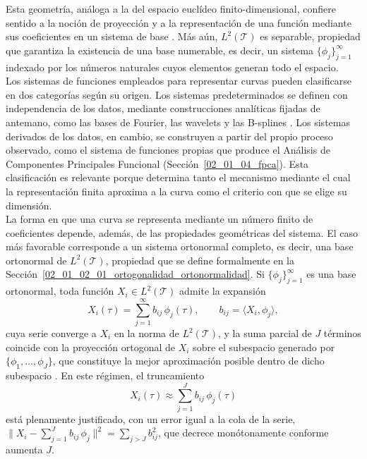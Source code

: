 Esta geometría, análoga a la del espacio euclídeo finito-dimensional, confiere sentido a la noción de proyección y a la representación de una función mediante sus coeficientes en un sistema de base \citep{02_01_kokoszka2017introduction}. Más aún, $L^2(\mathcal{T})$ es separable, propiedad que garantiza la existencia de una base numerable, es decir, un sistema $\{\phi_j\}_{j=1}^{\infty}$ indexado por los números naturales cuyos elementos generan todo el espacio.\\

Los sistemas de funciones empleados para representar curvas pueden clasificarse en dos categorías según su origen. Los sistemas predeterminados se definen con independencia de los datos, mediante construcciones analíticas fijadas de antemano, como las bases de Fourier, las wavelets y las B-splines \citep{02_01_ramsay2006functional}. Los sistemas derivados de los datos, en cambio, se construyen a partir del propio proceso observado, como el sistema de funciones propias que produce el Análisis de Componentes Principales Funcional (Sección~\ref{02_01_04_fpca}). Esta clasificación es relevante porque determina tanto el mecanismo mediante el cual la representación finita aproxima a la curva como el criterio con que se elige su dimensión.\\

La forma en que una curva se representa mediante un número finito de coeficientes depende, además, de las propiedades geométricas del sistema. El caso más favorable corresponde a un sistema ortonormal completo, es decir, una base ortonormal de $L^2(\mathcal{T})$, propiedad que se define formalmente en la Sección~\ref{02_01_02_01_ortogonalidad_ortonormalidad}. Si $\{\phi_j\}_{j=1}^{\infty}$ es una base ortonormal, toda función $X_i \in L^2(\mathcal{T})$ admite la expansión
\begin{equation}
    X_i(\tau) = \sum_{j=1}^{\infty} b_{ij}\, \phi_j(\tau),
    \qquad b_{ij} = \langle X_i, \phi_j \rangle,
\end{equation}
cuya serie converge a $X_i$ en la norma de $L^2(\mathcal{T})$, y la suma parcial de $J$ términos coincide con la proyección ortogonal de $X_i$ sobre el subespacio generado por $\{\phi_1, \dots, \phi_J\}$, que constituye la mejor aproximación posible dentro de dicho subespacio \citep{02_01_kokoszka2017introduction}. En este régimen, el truncamiento
\begin{equation}
    X_i(\tau) \approx \sum_{j=1}^{J} b_{ij}\, \phi_j(\tau)
\end{equation}
está plenamente justificado, con un error igual a la cola de la serie, $\bigl\| X_i - \sum_{j=1}^{J}b_{ij}\,\phi_j \bigr\|^2 = \sum_{j>J}b_{ij}^2$, que decrece monótonamente conforme aumenta $J$.\\

